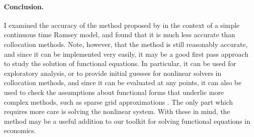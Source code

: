 \documentclass[a4paper,11pt]{article}
\begin{document}
\paragraph{Conclusion.} I examined the accuracy of the method proposed by \textcite{den2015exact} in the context of a simple continuous time Ramsey model, and found that it is much less accurate than collocation methods. Note, however, that the method is still reasonably accurate, and since it can be implemented very easily, it may be a good first pass approach to study the solution of functional equations. In particular, it can be used for exploratory analysis, or to provide initial guesses for nonlinear solvers in collocation methods, and since it can be evaluated at any points, it can also be used to check the assumptions about functional forms that underlie more complex methods, such as sparse grid approximations \parencite{judd2014smolyak}. The only part which requires more care is solving the nonlinear system. With these in mind, the method may be a useful addition to our toolkit for solving functional equations in economics.

\printbibliography
\end{document}
